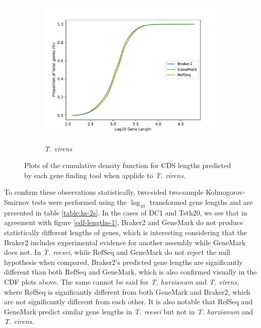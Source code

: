 \begin{figure}
  \centering
  \begin{subfigure}{0.7\textwidth}
    \includegraphics[width=\textwidth]{figures/t-virens-cdf-lengths-log.pdf}
    \label{fig:tvirens-lengths}
    \caption{\textit{T. virens}}
  \end{subfigure}
  \caption[CDF plots part 3.]{Plots of the
    cumulative density function for CDS lengths predicted by each gene
    finding tool when applide to \textit{T. virens.}}
  \label{fig:cdf-lengths-3}
\end{figure}

To confirm these observations statistically, two-sided two-sample
Kolmogorov-Smirnov tests were performed using the $\log_{10}$
transformed gene lengths and are presented in table
\ref{table:ks-2s}. In the cases of DC1 and Tsth20, we see that in
agreement with figure \ref{cdf-lengths-1}, Braker2 and GeneMark do not
produce statistically different lengths of genes, which is interesting
considering that the Braker2 includes experimental evidence for
another assembly while GeneMark does not. In \textit{T. reesei}, while
RefSeq and GeneMark do not reject the null hypothesis when compared,
Braker2's predicted gene lengths are significantly different than both
RefSeq and GeneMark, which is also confirmed visually in the CDF plots
above. The same cannot be said for \textit{T. harzianum} and
\textit{T. virens}, where RefSeq is significantly different from both
GeneMark and Braker2, which are not significantly different from
each other. It is also notable that RefSeq and GeneMark predict similar
gene lengths in \textit{T. reesei} but not in \textit{T. harzianum}
and \textit{T. virens.}

